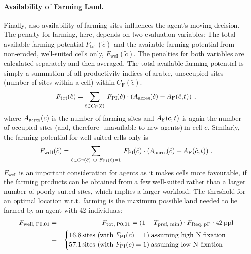 \paragraph{Availability of Farming Land.}%
Finally, also availability of farming sites influences the agent's moving decision.
The penalty for farming, here, depends on two evaluation variables: 
The total available farming potential $F_\text{tot}(\tilde{c})$ and the available farming potential from non-eroded, well-suited cells only, $F_\text{well}(\tilde{c})$.
The penalties for both variables are calculated separately and then averaged.
The total available farming potential is simply a summation of all productivity indices of arable, unoccupied sites (number of sites within a cell) within $C_\text{F}(\tilde{c})$.
\begin{equation}
	F_\text{tot}(\tilde{c}) = \sum_{\hat{c} \in C_{\rm F}(\tilde{c}) }\, F_{\rm PI}(\hat{c}) \cdot (A_{\rm acres}(\hat{c})  - A_{\rm F}(\hat{c}, t) ) \ ,
\end{equation}
where $A_{\rm acres}(c)$ is the number of farming sites and $ A_{\rm F}(c,t)$ is again the number of occupied sites (and, therefore, unavailable to new agents) in cell $c$.
Similarly, the farming potential for well-suited cells only is 
\begin{equation}
	F_\text{well}(\tilde{c}) = \sum_{\hat{c} \in C_{\rm F}(\tilde{c}) \ \cup \ F_{\rm PI}(\hat{c})=1} \, F_{\rm PI}(\hat{c}) \cdot (A_{\rm acres}(\hat{c})  - A_{\rm F}(\hat{c},t) ) \ .
\end{equation}
$F_\text{well}$ is an important consideration for agents as it makes cells more favourable, if the farming products can be obtained from a few well-suited rather than a larger number of poorly suited sites, which implies a larger workload.
The threshold for an optimal location w.r.t.\ farming is the maximum possible land needed to be farmed by an agent with $42$ individuals:
\begin{eqnarray}
F_\text{well, P0.01} & = & F_\text{tot, P0.01} =  (1-T_\text{pref, min})\cdot F_\text{Req, pP} \cdot 42\, {\rm ppl}  \\
& = & 
\begin{cases} 16.8\, {\rm sites}  \text{ (with }F_{\rm PI}(c)=1\text{) assuming high N fixation} \\  57.1 \, {\rm sites} \text{ (with }F_{\rm PI}(c)=1\text{) assuming low N fixation} \nonumber
\end{cases} 
\end{eqnarray}
